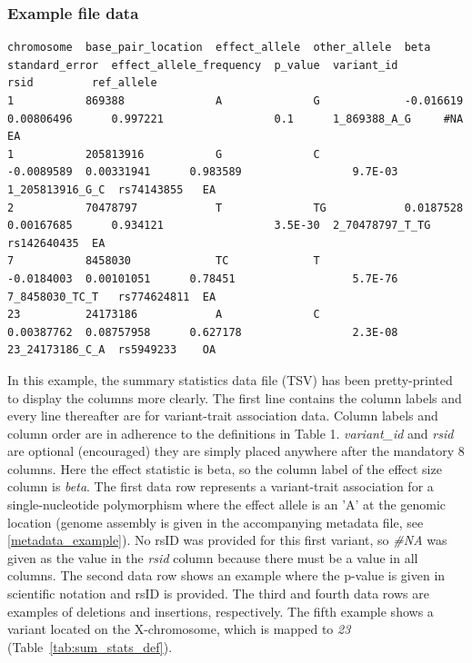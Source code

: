 \documentclass[11pt]{article}
\begin{document}
\begin{landscape}
\subsubsection{Example file data}
\scriptsize
\begin{verbatim}
chromosome  base_pair_location  effect_allele  other_allele  beta        standard_error  effect_allele_frequency  p_value  variant_id       rsid         ref_allele
1           869388              A              G             -0.016619   0.00806496      0.997221                 0.1      1_869388_A_G     #NA          EA
1           205813916           G              C             -0.0089589  0.00331941      0.983589                 9.7E-03  1_205813916_G_C  rs74143855   EA
2           70478797            T              TG            0.0187528   0.00167685      0.934121                 3.5E-30  2_70478797_T_TG  rs142640435  EA
7           8458030             TC             T             -0.0184003  0.00101051      0.78451                  5.7E-76  7_8458030_TC_T   rs774624811  EA
23          24173186            A              C             0.00387762  0.08757958      0.627178                 2.3E-08  23_24173186_C_A  rs5949233    OA
\end{verbatim}

\normalsize
        In this example, the summary statistics data file (TSV) has been pretty-printed to display the columns more clearly. The first line contains the column labels and every line thereafter are for variant-trait association data. Column labels and column order are in adherence to the definitions in Table 1. \textit{variant\_id} and \textit{rsid} are optional (encouraged) they are simply placed anywhere after the mandatory 8 columns. Here the effect statistic is beta, so the column label of the effect size column is \textit{beta}. The first data row represents a variant-trait association for a single-nucleotide polymorphism where the effect allele is an 'A' at the genomic location (genome assembly is given in the accompanying metadata file, see \ref{metadata_example}). No rsID was provided for this first variant, so \textit{\#NA} was given as the value in the \textit{rsid} column because there must be a value in all columns. The second data row shows an example where the p-value is given in scientific notation and rsID is provided. The third and fourth data rows are examples of deletions and insertions, respectively. The fifth example shows a variant located on the X-chromosome, which is mapped to \textit{23} (Table~\ref{tab:sum_stats_def}).
\end{landscape}
\end{document}
